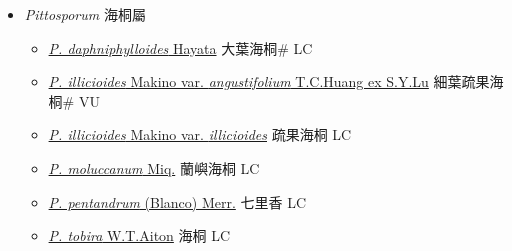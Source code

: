 
  \begin{itemize}
 \item[] \textit{Pittosporum} 海桐屬
                    
  \begin{itemize}
        \item[] \href{http://www.theplantlist.org/tpl1.1/search?q=Pittosporum+daphniphylloides}{\textit{P. daphniphylloides} Hayata}   大葉海桐\# LC
        \item[] \href{http://www.theplantlist.org/tpl1.1/search?q=Pittosporum+illicioides+var.+angustifolium}{\textit{P. illicioides} Makino var. \textit{angustifolium} T.C.Huang ex S.Y.Lu}   細葉疏果海桐\# VU
        \item[] \href{http://www.theplantlist.org/tpl1.1/search?q=Pittosporum+illicioides+var.+illicioides}{\textit{P. illicioides} Makino var. \textit{illicioides}}   疏果海桐 LC
        \item[] \href{http://www.theplantlist.org/tpl1.1/search?q=Pittosporum+moluccanum}{\textit{P. moluccanum} Miq.}   蘭嶼海桐 LC
        \item[] \href{http://www.theplantlist.org/tpl1.1/search?q=Pittosporum+pentandrum}{\textit{P. pentandrum} (Blanco) Merr.}   七里香 LC
        \item[] \href{http://www.theplantlist.org/tpl1.1/search?q=Pittosporum+tobira}{\textit{P. tobira} W.T.Aiton}   海桐 LC
  \end{itemize}
  \end{itemize}

